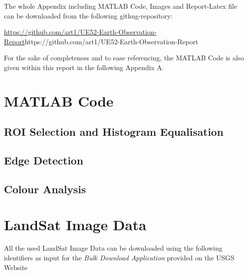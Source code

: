 The whole Appendix including MATLAB Code, Images and Report-Latex file    can be downloaded from the following githug-repository:

\begin{center}
	\url{https://github.com/art1/UE52-Earth-Observation-Report}{https://github.com/art1/UE52-Earth-Observation-Report}
\end{center}

For the sake of completeness and to ease referencing, the MATLAB Code is also given within this report in the following Appendix A.

\section{MATLAB Code}
\label{Appendix A}

\subsection{ROI Selection and Histogram Equalisation}
\label{selectROI}


\subsection{Edge Detection}
\label{edgeDetection}


\subsection{Colour Analysis}
\label{colouranalysis}


\section{LandSat Image Data}
\label{Appendix B}
All the used LandSat Image Data can be downloaded using the following identifiers as input for the \textit{Bulk Download Application} provided on the USGS Website



